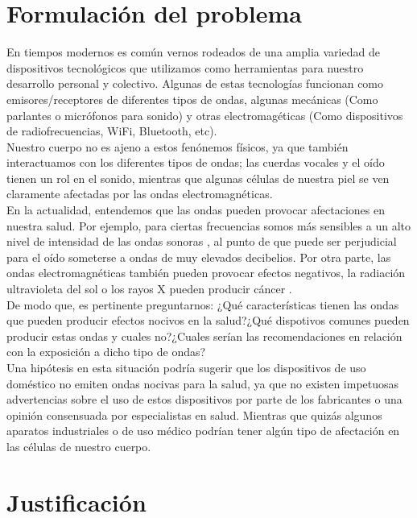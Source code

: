 \documentclass[spanish,notitlepage,letterpaper, 12pt]{article}
\begin{document}

\tableofcontents

\newpage

\section{Formulación del problema}
En tiempos modernos es común vernos rodeados de una amplia variedad de dispositivos tecnológicos que utilizamos como herramientas para nuestro desarrollo personal y colectivo. Algunas de estas tecnologías funcionan como emisores/receptores de diferentes tipos de ondas, algunas mecánicas (Como
parlantes o micrófonos para sonido) y otras
electromagéticas (Como dispositivos de radiofrecuencias, WiFi, Bluetooth, etc).\\

Nuestro cuerpo no es ajeno a estos fenónemos físicos, ya que también interactuamos con los diferentes tipos de ondas; las cuerdas vocales y el oído tienen un rol en el sonido, mientras que algunas células de nuestra piel se ven claramente afectadas por las ondas electromagnéticas. \cite{IDEAM}\\

En la actualidad, entendemos que las ondas pueden provocar afectaciones en nuestra salud.  Por ejemplo, para ciertas frecuencias somos más sensibles a un alto nivel de intensidad de las ondas sonoras \cite{serway_jewett_2017}, al punto de que puede ser perjudicial para el oído someterse a ondas de
muy elevados decibelios. Por otra parte, las ondas electromagnéticas también pueden provocar efectos negativos, la radiación ultravioleta del sol o los rayos X pueden producir cáncer \cite{Wall2006-pi}.\\

De modo que, es pertinente preguntarnos: ¿Qué características tienen las ondas que pueden producir efectos nocivos en la salud?¿Qué dispotivos comunes pueden producir estas ondas y cuales no?¿Cuales serían las recomendaciones en relación con la exposición a dicho tipo de ondas?\\

Una hipótesis en esta situación podría sugerir que los dispositivos de uso doméstico no emiten ondas nocivas para la salud, ya que no existen impetuosas advertencias sobre el uso de estos dispositivos por parte de los fabricantes o una opinión consensuada por especialistas en salud. Mientras que
quizás algunos aparatos industriales o de uso médico podrían tener algún tipo de afectación en las células de nuestro cuerpo.
\section{Justificación}
\end{document}
